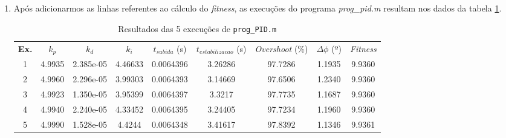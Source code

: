 \begin {enumerate}
    A população inicial é obtida pelo comando \texttt{pop =
    5*rand(tam\_pop,3);}, em que \texttt{rand} é uma função do MATLAB que gera
    números aleatórios segundo uma distribuição uniforme e \texttt{tam\_pop}
    vale 100. Será criada, portanto, uma matriz de 100 linhas, cada uma
    representando um indivíduo, e 3 colunas, uma para cada constante a ser
    determinada \(k_p\), \(k_d\) e \(k_i\).
    
    Finalmente, cada operador de \textit{crossover} é escolhido com 50\% de
    probabilidade. Espera-se portanto que o operador aritmétido seja escolhido
    em metade das oportunidades e o uniforme, também.
    
    \item Após adicionarmos as linhas referentes ao cálculo do \textit{fitness},
    as execuções do programa \textit{prog\_pid.m} resultam nos dados da tabela
    \ref{tab:pid_c}.
    
    \begin{table}[h]
	    \centering
		\caption{\label{tab:pid_c} Resultados das 5 execuções de
		\texttt{prog\_PID.m}}
		\begin{tabular}{| c | c | c | c | c | c | c | c | c |}
			\hline
			\textbf{Ex.} & \(k_p\) & \(k_d\) & \(k_i\) &
			\(t_{subida} \) (s) & \(t_{estabilizacao}\) (s) & \textit{Overshoot} (\%) &
			\(\Delta \phi\) (º)& \textit{Fitness}\\ \hhline{|=|=|=|=|=|=|=|=|=|}
			1 & 4.9935 & 2.385e-05 & 4.46633 & 0.0064396 & 3.26286 &  97.7286  &
			1.1935 & 9.9360\\ \hline 
			2 & 4.9960 & 2.296e-05 & 3.99303 & 0.0064393 & 3.14669 & 97.6506 & 
			1.2340 & 9.9360 \\
			\hline 3 & 4.9923 & 1.350e-05 & 3.95399 & 0.0064397 & 3.3217 & 97.7735 &
			1.1687 & 9.9360	\\
			\hline 4 & 4.9940 & 2.240e-05 & 4.33452 & 0.0064395 & 3.24405 & 97.7234 &
			1.1960 & 9.9360\\
			\hline 5 & 4.9990 & 1.528e-05 & 4.4244 & 0.0064348 & 3.41617  & 97.8392 &
			1.1346 & 9.9361 \\ 
			\hline
		\end{tabular}	    
    \end{table}
    

\end{enumerate}
